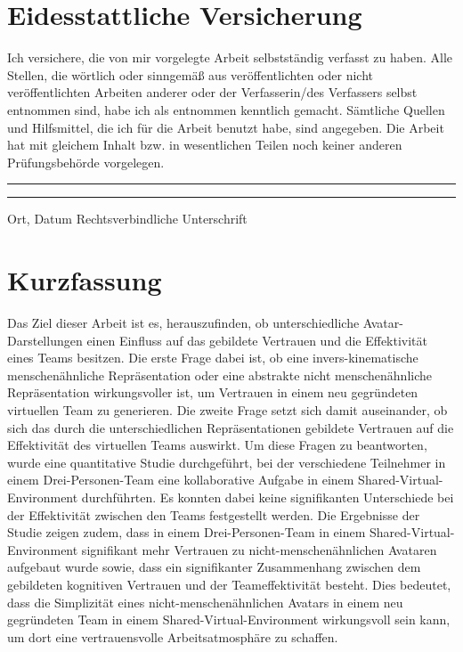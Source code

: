 \documentclass[a4paper,11pt]{article}%
\renewcommand{\\}{\vspace*{0.5\baselineskip} \newline}
\begin{document}
\section*{Eidesstattliche Versicherung}
	Ich versichere, die von mir vorgelegte Arbeit selbstständig verfasst zu haben. Alle Stellen, die wörtlich oder sinngemäß aus veröffentlichten oder nicht veröffentlichten Arbeiten anderer oder der Verfasserin/des Verfassers selbst entnommen sind, habe ich als entnommen kenntlich gemacht. Sämtliche Quellen und Hilfsmittel, die ich für die Arbeit benutzt habe, sind angegeben. Die Arbeit hat mit gleichem Inhalt bzw. in wesentlichen Teilen noch keiner anderen Prüfungsbehörde vorgelegen.\\
	~\\
	~\\
	\rule{0.35\textwidth}{0.4pt} \hspace*{3cm} \rule{0.45\textwidth}{0.4pt} \newline
	Ort, Datum	\hspace*{6.3cm}	Rechtsverbindliche Unterschrift
	\newpage
\section*{Kurzfassung}
Das Ziel dieser Arbeit ist es, herauszufinden, ob unterschiedliche Avatar-Darstellungen einen Einfluss auf das gebildete Vertrauen und die Effektivität eines Teams besitzen. Die erste Frage dabei ist, ob eine invers-kinematische menschenähnliche Repräsentation oder eine abstrakte nicht menschenähnliche Repräsentation wirkungsvoller ist, um Vertrauen in einem neu gegründeten virtuellen Team zu generieren. Die zweite Frage setzt sich damit auseinander, ob sich das durch die unterschiedlichen Repräsentationen gebildete Vertrauen auf die Effektivität des virtuellen Teams auswirkt. Um diese Fragen zu beantworten, wurde eine quantitative Studie durchgeführt, bei der verschiedene Teilnehmer in einem Drei-Personen-Team eine kollaborative Aufgabe in einem Shared-Virtual-Environment durchführten. Es konnten dabei keine signifikanten Unterschiede bei der Effektivität zwischen den Teams festgestellt werden. Die Ergebnisse der Studie zeigen zudem, dass in einem Drei-Personen-Team in einem Shared-Virtual-Environment signifikant mehr Vertrauen zu nicht-menschenähnlichen Avataren aufgebaut wurde sowie, dass ein signifikanter Zusammenhang zwischen dem gebildeten kognitiven Vertrauen und der Teameffektivität besteht. Dies bedeutet, dass die Simplizität eines nicht-menschenähnlichen Avatars in einem neu gegründeten Team in einem Shared-Virtual-Environment wirkungsvoll sein kann, um dort eine vertrauensvolle Arbeitsatmosphäre zu schaffen. 
	
\end{document}
